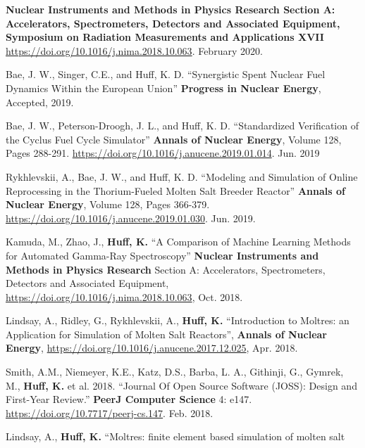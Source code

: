 \documentclass[margin,line]{resume}
\begin{document}
\begin{resume}
\begin{bibenum}
              \textbf{Nuclear Instruments and Methods in Physics Research
              Section A: Accelerators, Spectrometers, Detectors and Associated
              Equipment, Symposium on Radiation Measurements and Applications
              XVII} \url{https://doi.org/10.1016/j.nima.2018.10.063}. February
              2020.
      \item Bae, J. W., Singer, C.E., and Huff, K. D. ``Synergistic
              Spent Nuclear Fuel Dynamics Within the European Union''
              \textbf{Progress in Nuclear Energy}, Accepted, 2019.
      \item Bae, J. W., Peterson-Droogh, J. L., and Huff, K. D. ``Standardized
              Verification of the Cyclus Fuel Cycle Simulator'' \textbf{Annals
              of Nuclear Energy}, Volume 128, Pages 288-291.
              \url{https://doi.org/10.1016/j.anucene.2019.01.014}. Jun. 2019
      \item Rykhlevskii, A., Bae, J. W., and Huff, K. D. ``Modeling and
              Simulation of Online Reprocessing in the Thorium-Fueled Molten
              Salt Breeder Reactor'' \textbf{Annals of Nuclear Energy}, Volume 128,
              Pages 366-379.
              \url{https://doi.org/10.1016/j.anucene.2019.01.030}. Jun. 2019.
      \item  Kamuda, M., Zhao, J., \textbf{Huff, K.} ``A Comparison of Machine
              Learning Methods for Automated Gamma-Ray Spectroscopy''
              \textbf{Nuclear Instruments and Methods in Physics Research}
              Section A: Accelerators, Spectrometers, Detectors and Associated
              Equipment, \url{https://doi.org/10.1016/j.nima.2018.10.063}, Oct.
              2018.
       \item Lindsay, A., Ridley, G., Rykhlevskii, A., \textbf{Huff, K.}
               ``Introduction to Moltres: an Application for Simulation of
               Molten Salt Reactors'',  \textbf{Annals of Nuclear Energy},
               \url{https://doi.org/10.1016/j.anucene.2017.12.025},
               Apr. 2018.
       \item Smith, A.M., Niemeyer, K.E., Katz, D.S., Barba, L. A., Githinji,
               G., Gymrek, M., \textbf{Huff, K.} et al.
              2018. ``Journal Of Open Source Software (JOSS): Design and
              First-Year Review.'' \textbf{PeerJ Computer Science} 4: e147.
              \url{https://doi.org/10.7717/peerj-cs.147}. Feb. 2018.
       \item Lindsay, A., \textbf{Huff, K.}
               ``Moltres: finite element based simulation of molten salt

\end{bibenum}
\end{resume}
\end{document}
